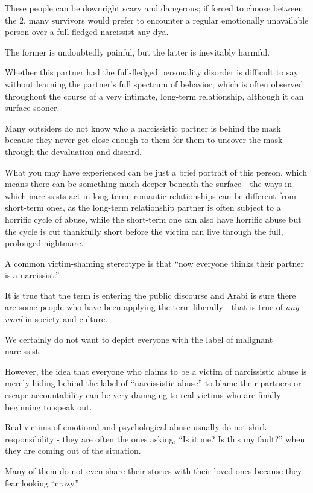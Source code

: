 \documentclass[oneside]{book}
\numberwithin{equation}{section}
\begin{document}
These people can be downright scary and dangerous; if forced to choose between the 2, many survivors would prefer to encounter a regular emotionally unavailable person over a full-fledged narcissist any dya.

The former is undoubtedly painful, but the latter is inevitably harmful.

%
Whether this partner had the full-fledged personality disorder is difficult to say without learning the partner's full spectrum of behavior, which is often observed throughout the course of a very intimate, long-term relationship, although it can surface sooner.

Many outsiders do not know who a narcissistic partner is behind the mask because they never get close enough to them for them to uncover the mask through the devaluation and discard.

%
What you may have experienced can be just a brief portrait of this person, which means there can be something much deeper beneath the surface - the ways in which narcissists act in long-term, romantic relationships can be different from short-term ones, as the long-term relationship partner is often subject to a horrific cycle of abuse, while the short-term one can also have horrific abuse but the cycle is cut thankfully short before the victim can live through the full, prolonged nightmare.

%
A common victim-shaming stereotype is that ``now everyone thinks their partner is a narcissist.''

It is true that the term is entering the public discourse and Arabi is sure there are some people who have been applying the term liberally - that is true of \textit{any word} in society and culture.

We certainly do not want to depict everyone with the label of malignant narcissist.

However, the idea that everyone who claims to be a victim of narcissistic abuse is merely hiding behind the label of ``narcissistic abuse'' to blame their partners or escape accountability can be very damaging to real victims who are finally beginning to speak out.

%
Real victims of emotional and psychological abuse usually do not shirk responsibility - they are often the ones asking, ``Is it me? Is this my fault?'' when they are coming out of the situation.

Many of them do not even share their stories with their loved ones because they fear looking ``crazy.''
\end{document}
